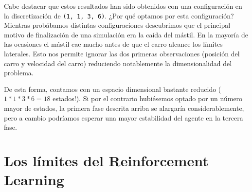 Cabe destacar que estos resultados han sido obtenidos con una configuración en la discretización de \texttt{(1, 1, 3, 6)}. ¿Por qué optamos por esta configuración? Mientras probábamos distintas configuraciones descubrimos que el principal motivo de finalización de una simulación era la caída del mástil. En la mayoría de las ocasiones el mástil cae mucho antes de que el carro alcance los límites laterales. Esto nos permite ignorar las dos primeras observaciones (posición del carro y velocidad del carro) reduciendo notablemente la dimensionalidad del problema.

De esta forma, contamos con un espacio dimensional bastante reducido ($1*1*3*6=18$ estados!). Si por el contrario hubiésemos optado por un número mayor de estados, la primera fase descrita arriba se alargaría considerablemente, pero a cambio podríamos esperar una mayor estabilidad del agente en la tercera fase.

\section{Los límites del Reinforcement Learning}
 